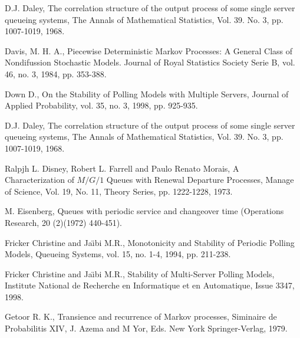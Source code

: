 \begin{thebibliography}{99}
 D.J. Daley, The correlation structure of the output process of
 some single server queueing systems, The Annals of Mathematical Statistics, Vol. 39. No. 3, pp. 1007-1019, 1968.

 Davis, M. H. A., Piecewise Deterministic Markov
Processes: A General Class of Nondifussion Stochastic Models.
Journal of Royal Statistics Society Serie B, vol. 46, no. 3, 1984,
pp. 353-388.

 Down D., On the Stability of Polling Models with Multiple Servers,
Journal of Applied Probability, vol. 35, no. 3, 1998, pp. 925-935.

 D.J. Daley, The correlation structure of the output process of  some single server queueing systems, The Annals of Mathematical Statistics, Vol. 39. No. 3, pp. 1007-1019, 1968. 

 Ralpjh L. Disney, Robert L. Farrell and Paulo Renato Morais, A Characterization of $M/G/1$ Queues with Renewal Departure Processes,  Manage of Science, Vol. 19, No. 11, Theory Series, pp. 1222-1228, 1973.

 M. Eisenberg, Queues with periodic service and changeover time
(Operations Research, 20 (2)(1972) 440-451).


Fricker Christine and Ja{\"\i}bi M.R., Monotonicity and Stability
of Periodic Polling Models,  Queueing Systems, vol. 15, no. 1-4,
1994, pp. 211-238.

Fricker Christine and Ja{\"\i}bi M.R., Stability of Multi-Server
Polling Models, Institute National de Recherche en Informatique et
en Automatique, Issue 3347, 1998.


 Getoor R. K., Transience and recurrence of
Markov processes, Siminaire de Probabilitis XIV, J. Azema and M
Yor, Eds. New York Springer-Verlag, 1979.


\end{thebibliography}
